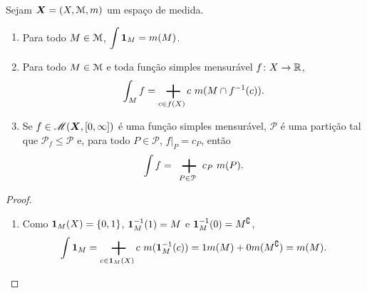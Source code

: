 \begin{proposition}
Sejam $\bm X = (X,\mathcal{M},m)$ um espaço de medida.
	\begin{enumerate}
	\item Para todo $M \in \mathcal{M}$, $\displaystyle\int {\bm 1}_M = m(M)$.
	\item Para todo $M \in \mathcal{M}$ e toda função simples mensurável $f\colon X \to \mathbb{R}$,
		\begin{equation*}
		\int_M f = \sum_{c \in f(X)} c \ \med(M \cap f\inv(c)).
		\end{equation*}
	
	\item Se $f \in \mathscr{M}(\bm X,\left[{0},{\infty}\right])$ é uma função simples mensurável, $\mathcal P$ é uma partição tal que $\mathcal P_f \leq \mathcal P$ e, para todo $P \in \mathcal P$, $f|_{P} = c_P$, então
		\begin{equation*}
		\int f = \sum_{P \in \mathcal P} c_P \ \med(P).
		\end{equation*}
	\end{enumerate}
\end{proposition}
\begin{proof}
	\begin{enumerate}
	\item Como ${\bm 1}_M(X) = \{0,1\}$, ${\bm 1}_M^{-1}(1) = M$ e ${\bm 1}_M^{-1}(0) = M^\complement$,
		\begin{equation*}
		\int \idc_M = \sum_{c \in \idc_M(X)} c \ \med(\idc_M\inv(c)) = 1 \med(M)+0\med(M^\complement) = \med(M).
		\end{equation*}
	\end{enumerate}
\end{proof}

